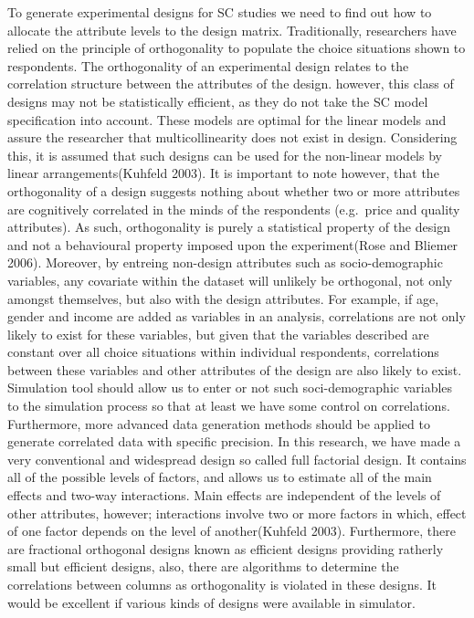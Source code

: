 \documentclass[12pt,]{article}
\begin{document}
To generate experimental designs for SC studies we need to find out how
to allocate the attribute levels to the design matrix. Traditionally,
researchers have relied on the principle of orthogonality to populate
the choice situations shown to respondents. The orthogonality of an
experimental design relates to the correlation structure between the
attributes of the design. however, this class of designs may not be
statistically efficient, as they do not take the SC model specification
into account. These models are optimal for the linear models and assure
the researcher that multicollinearity does not exist in design.
Considering this, it is assumed that such designs can be used for the
non-linear models by linear arrangements(Kuhfeld 2003). It is important
to note however, that the orthogonality of a design suggests nothing
about whether two or more attributes are cognitively correlated in the
minds of the respondents (e.g.~price and quality attributes). As such,
orthogonality is purely a statistical property of the design and not a
behavioural property imposed upon the experiment(Rose and Bliemer 2006).
Moreover, by entreing non-design attributes such as socio-demographic
variables, any covariate within the dataset will unlikely be orthogonal,
not only amongst themselves, but also with the design attributes. For
example, if age, gender and income are added as variables in an
analysis, correlations are not only likely to exist for these variables,
but given that the variables described are constant over all choice
situations within individual respondents, correlations between these
variables and other attributes of the design are also likely to exist.
Simulation tool should allow us to enter or not such soci-demographic
variables to the simulation process so that at least we have some
control on correlations. Furthermore, more advanced data generation
methods should be applied to generate correlated data with specific
precision. In this research, we have made a very conventional and
widespread design so called full factorial design. It contains all of
the possible levels of factors, and allows us to estimate all of the
main effects and two-way interactions. Main effects are independent of
the levels of other attributes, however; interactions involve two or
more factors in which, effect of one factor depends on the level of
another(Kuhfeld 2003). Furthermore, there are fractional orthogonal
designs known as efficient designs providing ratherly small but
efficient designs, also, there are algorithms to determine the
correlations between columns as orthogonality is violated in these
designs. It would be excellent if various kinds of designs were
available in simulator.
\end{document}
